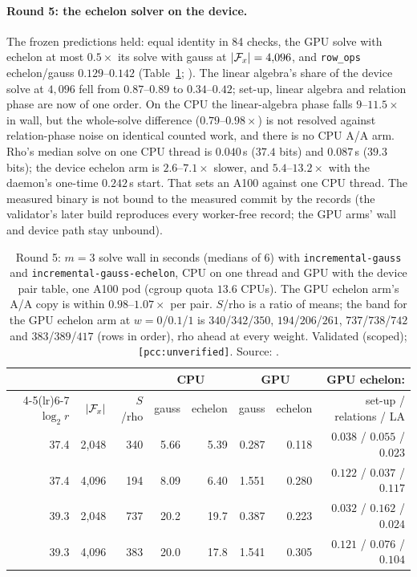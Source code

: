 \paragraph{Round 5: the echelon solver on the device.} The frozen
predictions held: equal identity in 84 checks, the GPU solve with echelon
at most $0.5\times$ its solve with gauss at $\lvert \mathcal{F}_x \rvert=4{,}096$, and
\texttt{row\_ops} echelon/gauss $0.129$--$0.142$
(Table~\ref{tab:rf-gpu-la}; ).
The linear algebra's share of the device solve at $4{,}096$ fell from
$0.87$--$0.89$ to $0.34$--$0.42$; set-up, linear algebra and relation phase
are now of one order. On the CPU the linear-algebra phase falls $9$--$11.5\times$
in wall, but the whole-solve difference ($0.79$--$0.98\times$) is not
resolved against relation-phase noise on identical counted work, and there
is no CPU A/A arm. Rho's median solve on one CPU thread is $0.040$\,s
($37.4$ bits) and $0.087$\,s ($39.3$ bits); the device echelon arm is
$2.6$--$7.1\times$ slower, and $5.4$--$13.2\times$ with the daemon's one-time
$0.242$\,s start. That sets an A100 against one CPU thread. The measured
binary is not bound to the measured commit by the records (the validator's
later build reproduces every worker-free record; the GPU arms' wall and
device path stay unbound).

\begin{table}[t]
\centering\small
\begin{tabular}{@{}rrrrrrrr@{}}
\toprule
& & & \multicolumn{2}{c}{CPU} & \multicolumn{2}{c}{GPU} & GPU echelon: \\
\cmidrule(lr){4-5}\cmidrule(lr){6-7}
$\log_2r$ & $\lvert \mathcal{F}_x \rvert$ & $S$/rho & gauss & echelon & gauss & echelon & set-up / relations / LA \\
\midrule
37.4 & 2{,}048 & 340 & 5.66 & 5.39 & 0.287 & 0.118 & $0.038$ / $0.055$ / $0.023$ \\
37.4 & 4{,}096 & 194 & 8.09 & 6.40 & 1.551 & 0.280 & $0.122$ / $0.037$ / $0.117$ \\
39.3 & 2{,}048 & 737 & 20.2 & 19.7 & 0.387 & 0.223 & $0.032$ / $0.162$ / $0.024$ \\
39.3 & 4{,}096 & 383 & 20.0 & 17.8 & 1.541 & 0.305 & $0.121$ / $0.076$ / $0.104$ \\
\bottomrule
\end{tabular}
\caption[]{Round 5: $m=3$ solve wall in seconds (medians of 6) with
\texttt{incremental-gauss} and \texttt{incremental-gauss-echelon}, CPU on
one thread and GPU with the device pair table, one A100 pod (cgroup quota
$13.6$ CPUs). The GPU echelon arm's A/A copy is within $0.98$--$1.07\times$
per pair. $S$/rho is a ratio of means; the band for the GPU echelon arm at
$w=0$/$0.1$/$1$ is $340$/$342$/$350$, $194$/$206$/$261$, $737$/$738$/$742$
and $383$/$389$/$417$ (rows in order), rho ahead at every weight.
Validated (scoped); \texttt{[pcc:unverified]}. Source:
.}
\label{tab:rf-gpu-la}
\end{table}

